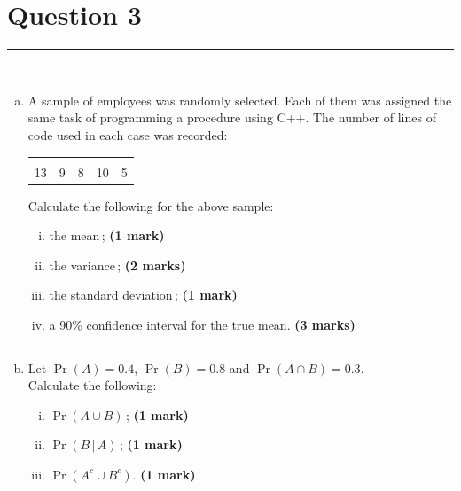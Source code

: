\documentclass[12pt]{article}
\begin{document}
\newpage



\section*{Question 3 }
\noindent\rule{\linewidth}{1pt}
\quad\\[-0.5cm]
\begin{enumerate}[a)]
\item A sample of employees was randomly selected. Each of them was assigned the same task of programming a procedure using C++. The number of lines of code used in each case was recorded:
\begin{center}
\begin{tabular}{|ccccc|}
\hline
&&&&\\[-0.4cm]
13 & 9 & 8 & 10 & 5\\
\hline
\end{tabular}
\end{center}
Calculate the following for the above sample:
    \begin{enumerate}[i)]\itemsep0.3cm
    \item the mean\,; \hfill{\scriptsize \bf (1 mark)}
    \item the variance\,; \hfill{\scriptsize \bf (2 marks)}
    \item the standard deviation\,; \hfill{\scriptsize \bf (1 mark)}
    \item a 90\% confidence interval for the true mean. \hfill{\scriptsize \bf (3 marks)}
    \end{enumerate}
\begin{center}\noindent\rule{0.4\linewidth}{0.5pt}\end{center}
\item Let $\Pr(A) = 0.4$, $\Pr(B)=0.8$ and $\Pr(A\cap B) = 0.3$.\\[0.2cm]
    Calculate the following:
    \begin{enumerate}[i)]\itemsep0.3cm
    \item $\Pr(A\cup B)$\,; \hfill{\scriptsize \bf (1 mark)}
    \item $\Pr(B\,|\,A)$\,; \hfill{\scriptsize \bf (1 mark)}
    \item $\Pr(A^c \cup B^c)$. \hfill{\scriptsize \bf (1 mark)}

\end{enumerate}
\end{enumerate}
\end{document}
